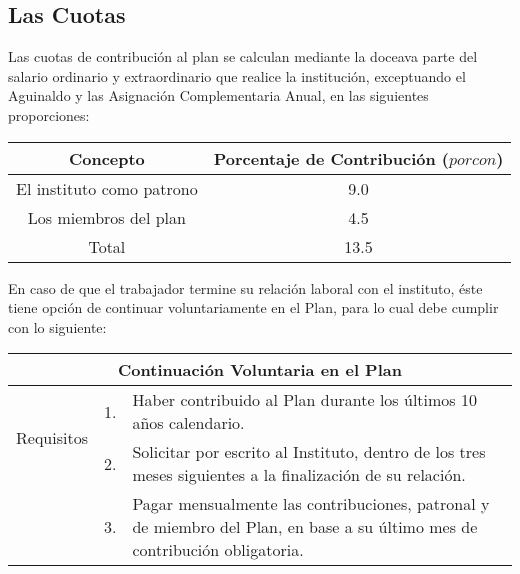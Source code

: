 \documentclass[12pt,letterpaper,titlepage]{article}
\begin{document}
{\subsection{Las Cuotas}

Las cuotas de contribución al plan se calculan mediante la doceava parte del salario ordinario y extraordinario que realice la institución, exceptuando  el Aguinaldo y las Asignación Complementaria Anual, en las siguientes proporciones:

\begin{center}
	\begin{tabular}{|c||c|}
		\hline 
		\rule[-1ex]{0pt}{2.5ex} Concepto & Porcentaje de Contribución ($porcon$)\\ 
		\hline 
		\hline 
		\rule[-1ex]{0pt}{2.5ex}
		\rule[-1ex]{0pt}{2.5ex} El instituto como patrono & 9.0 \\ 
		\hline 
		\rule[-1ex]{0pt}{2.5ex} Los miembros del plan & 4.5 \\ 
		\hline 
		\rule[-1ex]{0pt}{2.5ex} Total & 13.5 \\ 
		\hline 
	\end{tabular} 
\end{center}

En caso de que el trabajador termine su relación laboral con el instituto, éste tiene opción de continuar voluntariamente en el Plan, para lo cual debe cumplir con lo siguiente:

\begin{center}
	\begin{tabular}{|c||c||p{10cm}|}
		\hline 
		\multicolumn{3}{|c|}{Continuación Voluntaria en el Plan} \\ 
		\hline 
		\hline 
		\multirow{2}{24mm}[-20mm]{Requisitos}& 1. & Haber contribuido al Plan durante los últimos 10 años calendario. \\ 
		\cline{2-3}
		& 2. & Solicitar por escrito al Instituto, dentro de los tres meses siguientes a la finalización de su relación. \\ 
		\cline{2-3}
		& 3. & Pagar mensualmente las contribuciones, patronal y de miembro del Plan, en base a su último mes de contribución obligatoria. \\ 
		\hline 
	\end{tabular} 
\end{center}


\newpage

}
\end{document}

